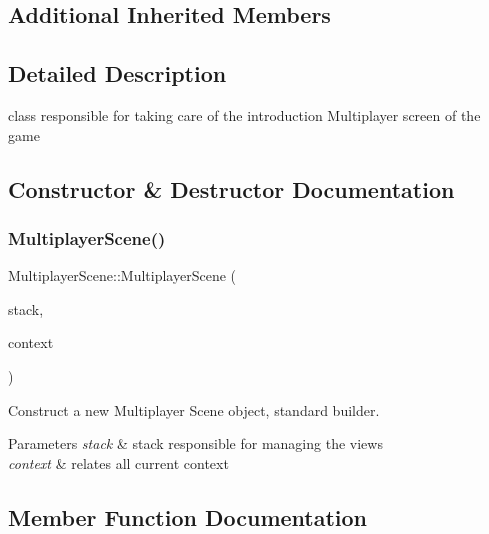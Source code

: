\subsection*{Additional Inherited Members}


\subsection{Detailed Description}
class responsible for taking care of the introduction Multiplayer screen of the game 

\subsection{Constructor \& Destructor Documentation}
\mbox{\label{classMultiplayerScene_a0a555300aaf7b66d983e35c8b6dbe495}} 
\subsubsection{\texorpdfstring{Multiplayer\+Scene()}{MultiplayerScene()}}
{\footnotesize\ttfamily Multiplayer\+Scene\+::\+Multiplayer\+Scene (\begin{DoxyParamCaption}\item[{\hyperlink{classStateManager}{State\+Manager} \&}]{stack,  }\item[{\hyperlink{structState_1_1Context}{Context}}]{context }\end{DoxyParamCaption})}



Construct a new Multiplayer Scene object, standard builder. 


\begin{DoxyParams}{Parameters}
{\em stack} & stack responsible for managing the views \\
\hline
{\em context} & relates all current context \\
\hline
\end{DoxyParams}


\subsection{Member Function Documentation}
\mbox{\label{classMultiplayerScene_af2bcc458cda1d272acabc342eb79d25a}} 
